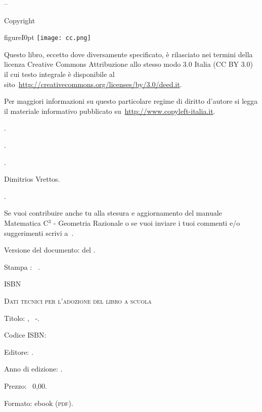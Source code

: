 \thispagestyle{empty}
{\setlength{\parindent}{0em}\small{
\begin{center}
{\large{\serie – \titolo}}

Copyright {\textcopyright} {\anno} \editore
\end{center}

\begin{wrapfloat}{figure}{I}{0pt}
\texttt{[image: cc.png]}
\end{wrapfloat}

Questo libro, eccetto dove diversamente specificato, è rilasciato nei termini 
della licenza Creative Commons Attribuzione allo stesso modo 3.0 Italia
(CC BY 3.0) il cui testo integrale è disponibile al 
sito~\url{http://creativecommons.org/licenses/by/3.0/deed.it}.

Per maggiori informazioni su questo particolare regime di diritto d'autore si 
legga il materiale informativo pubblicato su~\url{http://www.copyleft-italia.it}.

 \coord .

 \autori.

 \colab.

 {Dimitrios Vrettos}.

 {\texcol}.

 Se vuoi contribuire anche tu alla stesura e aggiornamento 
del manuale Matematica C$^3$ - Geometria Razionale o se  vuoi inviare i tuoi commenti e/o suggerimenti scrivi 
a~.

\vspace{2ex}
 Versione del documento: {\docvers} del {\oggi}.

 Stampa \edizione : \mese\ \anno.

 ISBN \mcisbn

\vspace{2ex}
 {\scshape{Dati tecnici per l'adozione del libro a scuola}}

 Titolo: \serie, \titolo\ -\edizione.

 Codice ISBN: \mcisbn 

 Editore: \href{http://www.matematicamente.it}{\editore}. 

 Anno di edizione: \anno.

 Prezzo: \officialeuro\ 0,00.

 Formato: ebook (\scshape{pdf}).
}}
\cleardoublepage
